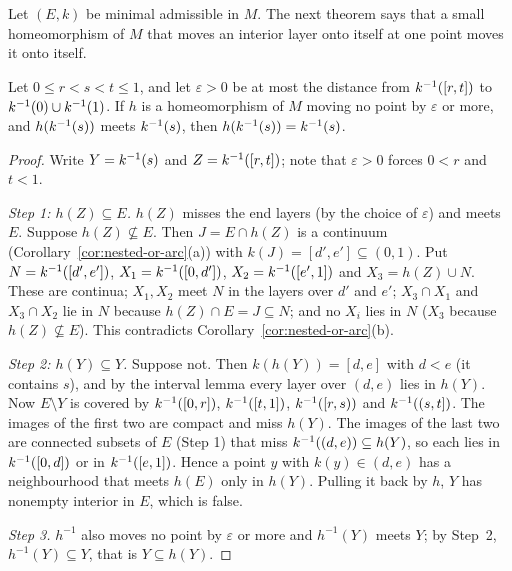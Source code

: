 Let $(E,k)$ be minimal admissible in $M$. The next theorem says that a small homeomorphism of $M$ that moves an
interior layer onto itself at one point moves it onto itself.

\begin{theorem}\label{thm:layer-invariant}
Let $0\le r<s<t\le1$, and let $\varepsilon>0$ be at most the distance from $k^{-1}([r,t])$ to $k^{-1}(0)\cup k^{-1}(1)$. If $h$ is
a homeomorphism of $M$ moving no point by $\varepsilon$ or more, and $h(k^{-1}(s))$ meets $k^{-1}(s)$, then $h(k^{-1}(s))=k^{-1}(s)$.
\end{theorem}

\begin{proof}
Write $Y=k^{-1}(s)$ and $Z=k^{-1}([r,t])$; note that $\varepsilon>0$ forces $0<r$ and $t<1$.

\emph{Step 1: $h(Z)\subseteq E$.} $h(Z)$ misses the end layers (by the choice of $\varepsilon$) and meets $E$. Suppose
$h(Z)\not\subseteq E$. Then $J=E\cap h(Z)$ is a continuum (Corollary~\ref{cor:nested-or-arc}(a)) with $k(J)=[d',e']\subseteq(0,1)$.
Put $N=k^{-1}([d',e'])$, $X_1=k^{-1}([0,d'])$, $X_2=k^{-1}([e',1])$ and $X_3=h(Z)\cup N$. These are continua; $X_1,X_2$ meet $N$
in the layers over $d'$ and $e'$; $X_3\cap X_1$ and $X_3\cap X_2$ lie in $N$ because $h(Z)\cap E=J\subseteq N$; and no $X_i$ lies in
$N$ ($X_3$ because $h(Z)\not\subseteq E$). This contradicts Corollary~\ref{cor:nested-or-arc}(b).

\emph{Step 2: $h(Y)\subseteq Y$.} Suppose not. Then $k(h(Y))=[d,e]$ with $d<e$ (it contains $s$), and by the interval lemma
every layer over $(d,e)$ lies in $h(Y)$. Now $E\setminus Y$ is covered by $k^{-1}([0,r])$, $k^{-1}([t,1])$, $k^{-1}([r,s))$ and
$k^{-1}((s,t])$. The images of the first two are compact and miss $h(Y)$. The images of the last two are connected
subsets of $E$ (Step 1) that miss $k^{-1}((d,e))\subseteq h(Y)$, so each lies in $k^{-1}([0,d])$ or in $k^{-1}([e,1])$. Hence a
point $y$ with $k(y)\in(d,e)$ has a neighbourhood that meets $h(E)$ only in $h(Y)$. Pulling it back by $h$, $Y$ has
nonempty interior in $E$, which is false.

\emph{Step 3.} $h^{-1}$ also moves no point by $\varepsilon$ or more and $h^{-1}(Y)$ meets $Y$; by Step~2, $h^{-1}(Y)\subseteq Y$,
that is $Y\subseteq h(Y)$.
\end{proof}


